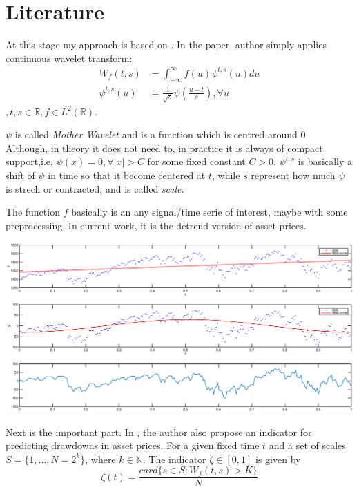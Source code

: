 \documentclass[a4paper]{article}
\author{Chan Pruksapha}
\begin{document}
\section{Literature}

At this stage my approach is based on \cite{caete09}.
In the paper, author simply applies continuous wavelet transform:
\begin{align}
W_f(t,s)&= \int_{-\infty}^\infty f(u) \psi^{t,s}(u)du \label{def:cwt} \\
\psi^{t,s}(u) &= \frac{1}{\sqrt s} \psi(\frac{u-t}{s}), \forall u \nonumber
\end{align}
$,t,s \in \mathbb{R}, f\in L^2(\mathbb{R})$.

$\psi$ is called \textit{Mother Wavelet} and is a function which is centred around $0$. Although, in theory it does not need to, in practice it is always of compact support,i.e, $\psi(x) = 0, \forall |x| > C $ for some fixed constant $C>0$.
$\psi^{t,s}$ is basically a shift of $\psi$ in time so that it become centered at $t$, while $s$ represent how much $\psi$ is strech or contracted, and is called \textit{scale}. 

The function $f$ basically is an any signal/time serie of interest, maybe with some preprocessing.
In current work, it is the detrend version of asset prices.

\includegraphics[width=\textwidth]{detrend.eps}

Next is the important part. In \cite{caete09}, the author also propose an indicator for predicting drawdowns in asset prices. For a given fixed time $t$ and a set of scales $S=\{1,\dots,N=2^k\}$, where $k\in \mathbb{N}$. The indicator $\zeta \in [0,1]$ is given by
\begin{equation}
\zeta(t) = \frac{card{\{ s \in S: W_f(t,s) > K\}}}{N}
\end{equation}
\end{document}
